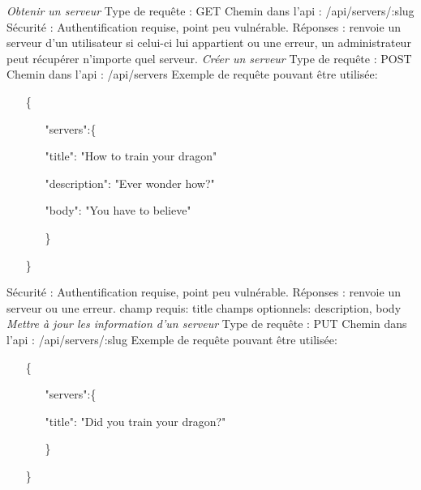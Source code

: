 \documentclass{article}
\begin{document}
\newline
\textit{Obtenir un serveur}
\newline
Type de requête : GET
\newline
Chemin dans l'api : /api/servers/:slug
\newline
Sécurité : Authentification requise, point peu vulnérable.
\newline
Réponses : renvoie un serveur d'un utilisateur si celui-ci lui appartient ou une erreur, un administrateur peut récupérer n'importe quel serveur.
\newline
\newline
\textit{Créer un serveur}
\newline
Type de requête : POST
\newline
Chemin dans l'api : /api/servers
\newline
Exemple de requête pouvant être utilisée:
\begin{itemize}
	\item[\{]
	\begin{itemize}
		\item[]
		\item["servers":\{]
		\item[]"title": "How to train your dragon"
		\item[]"description": "Ever wonder how?"
		\item[]"body": "You have to believe"
		\item[\}]
	\end{itemize}
	\item[\}]
\end{itemize}
Sécurité : Authentification requise, point peu vulnérable.
\newline
Réponses : renvoie un serveur ou une erreur.
\newline
champ requis: title
\newline
champs optionnels: description, body
\newline
\newline
\textit{Mettre à jour les information d'un serveur}
\newline
Type de requête : PUT
\newline
Chemin dans l'api : /api/servers/:slug
\newline
Exemple de requête pouvant être utilisée:
\begin{itemize}
	\item[\{]
	\begin{itemize}
		\item[]
		\item["servers":\{]
		\item[]"title": "Did you train your dragon?"
		\item[\}]
	\end{itemize}
	\item[\}]
\end{itemize}
\end{document}
